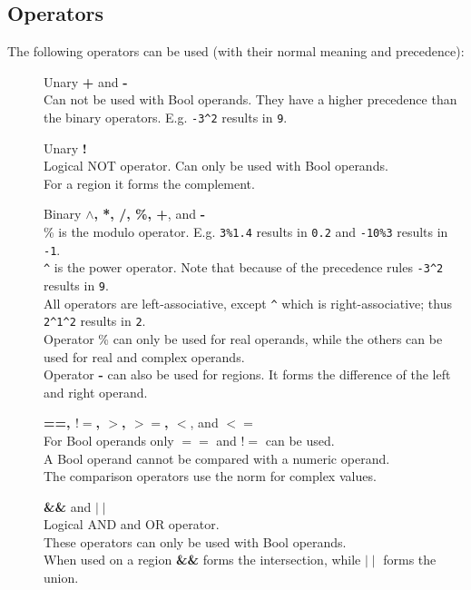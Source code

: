 \subsection{\label{LEL:OPERATORS}Operators}
The following operators can be used (with their normal meaning and
precedence):
\begin{description}
  \item[] Unary \textbf{+} and \textbf{-}
       \\Can not be used with Bool operands.
       They have a higher precedence than the binary operators.
       E.g. \texttt{-3}\verb+^+\texttt{2} results in \texttt{9}.
  \item[] Unary \textbf{!}
       \\Logical NOT operator.
       Can only be used with Bool operands.
       \\For a region it forms the complement.
  \item[] Binary \textbf{$\wedge$, *, /, \%, +}, and \textbf{-}
       \\\% is the modulo operator.
       E.g. \texttt{3\%1.4} results in \texttt{0.2} and
       \texttt{-10\%3} results in \texttt{-1}.
       \\\verb+^+ is the power operator.
       Note that because of the precedence rules
       \texttt{-3}\verb+^+\texttt{2} results in \texttt{9}.
       \\All operators are left-associative, except \verb+^+ which is
       right-associative; thus
       \texttt{2}\verb+^+\texttt{1}\verb+^+\texttt{2} results in \texttt{2}.
       \\Operator \% can only be used for real operands, while the others
       can be used for real and complex operands.
        \\Operator \textbf{-} can also be used for regions. It forms
        the difference of the left and right operand.
  \item[] \textbf{==, $!=$, $>$, $>=$, $<$}, and \textbf{$<=$}
       \\For Bool operands only $==$ and $!=$ can be used.
       \\A Bool operand cannot be compared with a numeric operand.
       \\The comparison operators use the norm for complex values.
  \item[] \textbf{\&\&} and \textbf{$\mid\mid$}
       \\Logical AND and OR operator. 
       \\These operators can only be used with Bool operands.
       \\When used on a region \textbf{\&\&} forms the intersection,
       while \textbf{$\mid\mid$} forms the union.
\end{description}
